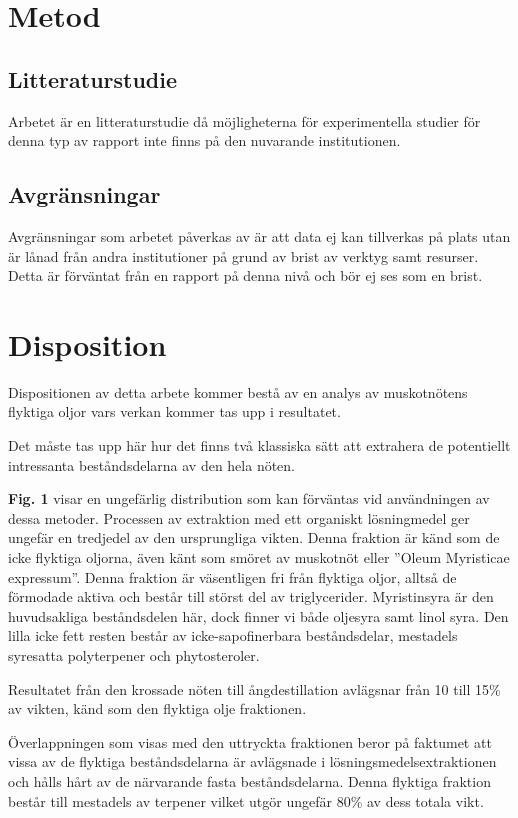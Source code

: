 \documentclass[a4paper,margin=3.25cm]{article}
\begin{document}
	\section{Metod}%

\subsection{Litteraturstudie}
	Arbetet är en litteraturstudie då möjligheterna för experimentella studier  för denna typ av rapport inte finns på den nuvarande institutionen.
	\subsection{Avgränsningar}
Avgränsningar som arbetet påverkas av är att data ej kan tillverkas på plats utan
är lånad från andra institutioner på grund av brist av verktyg samt resurser.
Detta är förväntat från en rapport på denna nivå och bör ej ses som en brist.

\pagebreak

\section{Disposition}

Dispositionen av detta arbete kommer bestå av en analys av muskotnötens flyktiga oljor
vars verkan kommer tas upp i resultatet.

Det måste tas upp här hur det finns två klassiska sätt att extrahera de potentiellt intressanta beståndsdelarna av den hela nöten.

\textbf{Fig. 1} \cite{shulgin1967chemistry} visar en ungefärlig distribution som kan förväntas vid användningen av dessa metoder. Processen av extraktion med ett organiskt lösningmedel ger ungefär en tredjedel av den ursprungliga vikten. Denna fraktion är känd som de icke flyktiga oljorna, även känt som smöret av muskotnöt eller ''Oleum Myristicae expressum''. Denna fraktion är väsentligen fri från flyktiga oljor, alltså de förmodade aktiva och består till störst del av triglycerider. Myristinsyra är den huvudsakliga beståndsdelen här, dock finner vi både oljesyra samt linol syra. Den lilla icke fett resten består av icke-sapofinerbara beståndsdelar, mestadels syresatta polyterpener och phytosteroler. \cite{shulgin1967chemistry}

Resultatet från den krossade nöten till ångdestillation avlägsnar från 10 till 15\% av vikten, känd som den flyktiga olje fraktionen.

Överlappningen som visas med den uttryckta fraktionen beror på faktumet att vissa av de flyktiga beståndsdelarna är avlägsnade i lösningsmedelsextraktionen och hålls hårt av de närvarande fasta beståndsdelarna.
Denna flyktiga fraktion består till mestadels av terpener vilket utgör ungefär 80\% av dess totala vikt.
\end{document}
